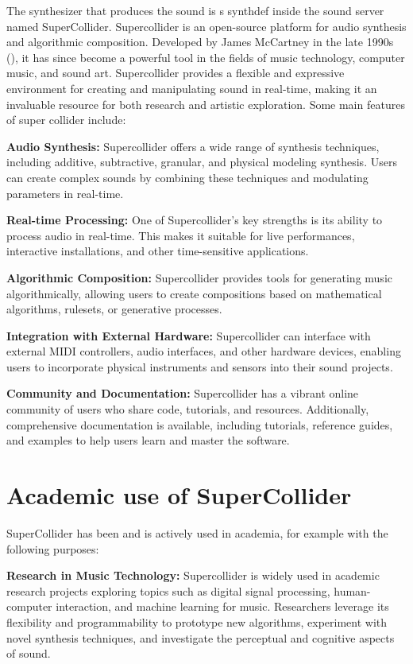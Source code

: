 \documentclass[a4paper]{book}
\begin{document}
The synthesizer that produces the sound is s synthdef inside the sound server named SuperCollider. Supercollider is an open-source platform for audio synthesis and algorithmic composition. Developed by James McCartney in the late 1990s (\cite{scBook}), it has since become a powerful tool in the fields of music technology, computer music, and sound art. Supercollider provides a flexible and expressive environment for creating and manipulating sound in real-time, making it an invaluable resource for both research and artistic exploration. Some main features of super collider include:

\textbf{Audio Synthesis:} Supercollider offers a wide range of synthesis techniques, including additive, subtractive, granular, and physical modeling synthesis. Users can create complex sounds by combining these techniques and modulating parameters in real-time.


\textbf{Real-time Processing:} One of Supercollider's key strengths is its ability to process audio in real-time. This makes it suitable for live performances, interactive installations, and other time-sensitive applications.

\textbf{Algorithmic Composition:} Supercollider provides tools for generating music algorithmically, allowing users to create compositions based on mathematical algorithms, rulesets, or generative processes.

\textbf{Integration with External Hardware:} Supercollider can interface with external MIDI controllers, audio interfaces, and other hardware devices, enabling users to incorporate physical instruments and sensors into their sound projects.

\textbf{Community and Documentation:} Supercollider has a vibrant online community of users who share code, tutorials, and resources. Additionally, comprehensive documentation is available, including tutorials, reference guides, and examples to help users learn and master the software.

\section*{Academic use of SuperCollider}
SuperCollider has been and is actively used in academia, for example with the following purposes:

\textbf{Research in Music Technology:} Supercollider is widely used in academic research projects exploring topics such as digital signal processing, human-computer interaction, and machine learning for music. Researchers leverage its flexibility and programmability to prototype new algorithms, experiment with novel synthesis techniques, and investigate the perceptual and cognitive aspects of sound.
\end{document}
